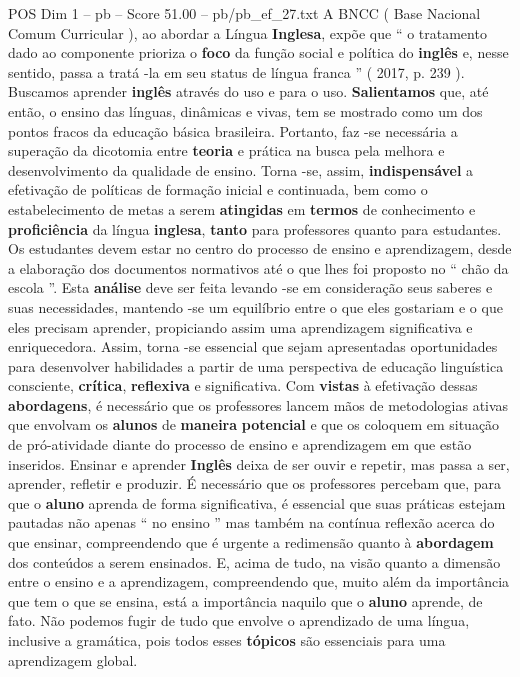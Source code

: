 \begin{textsample}{POS Dim 1 – pb – Score 51.00 – pb/pb\_ef\_27.txt}
A BNCC ( Base Nacional Comum Curricular ), ao abordar a Língua \textbf{Inglesa}, expõe que “ o tratamento dado ao componente prioriza o \textbf{foco} da função social e política do \textbf{inglês} e, nesse sentido, passa a tratá -la em seu status de língua franca ” ( 2017, p. 239 ).
Buscamos aprender \textbf{inglês} através do uso e para o uso. \textbf{Salientamos} que, até então, o ensino das línguas, dinâmicas e vivas, tem se mostrado como um dos pontos fracos da educação básica brasileira.
Portanto, faz -se necessária a superação da dicotomia entre \textbf{teoria} e prática na busca pela melhora e desenvolvimento da qualidade de ensino.
Torna -se, assim, \textbf{indispensável} a efetivação de políticas de formação inicial e continuada, bem como o estabelecimento de metas a serem \textbf{atingidas} em \textbf{termos} de conhecimento e \textbf{proficiência} da língua \textbf{inglesa}, \textbf{tanto} para professores quanto para estudantes.
Os estudantes devem estar no centro do processo de ensino e aprendizagem, desde a elaboração dos documentos normativos até o que lhes foi proposto no “ chão da escola ”.
Esta \textbf{análise} deve ser feita levando -se em consideração seus saberes e suas necessidades, mantendo -se um equilíbrio entre o que eles gostariam e o que eles precisam aprender, propiciando assim uma aprendizagem significativa e enriquecedora.
Assim, torna -se essencial que sejam apresentadas oportunidades para desenvolver habilidades a partir de uma perspectiva de educação linguística consciente, \textbf{crítica}, \textbf{reflexiva} e significativa.
Com \textbf{vistas} à efetivação dessas \textbf{abordagens}, é necessário que os professores lancem mãos de metodologias ativas que envolvam os \textbf{alunos} de \textbf{maneira} \textbf{potencial} e que os coloquem em situação de pró-atividade diante do processo de ensino e aprendizagem em que estão inseridos.
Ensinar e aprender \textbf{Inglês} deixa de ser ouvir e repetir, mas passa a ser, aprender, refletir e produzir.
É necessário que os professores percebam que, para que o \textbf{aluno} aprenda de forma significativa, é essencial que suas práticas estejam pautadas não apenas “ no ensino ” mas também na contínua reflexão acerca do que ensinar, compreendendo que é urgente a redimensão quanto à \textbf{abordagem} dos conteúdos a serem ensinados.
E, acima de tudo, na visão quanto a dimensão entre o ensino e a aprendizagem, compreendendo que, muito além da importância que tem o que se ensina, está a importância naquilo que o \textbf{aluno} aprende, de fato.
Não podemos fugir de tudo que envolve o aprendizado de uma língua, inclusive a gramática, pois todos esses \textbf{tópicos} são essenciais para uma aprendizagem global.

\end{textsample}
